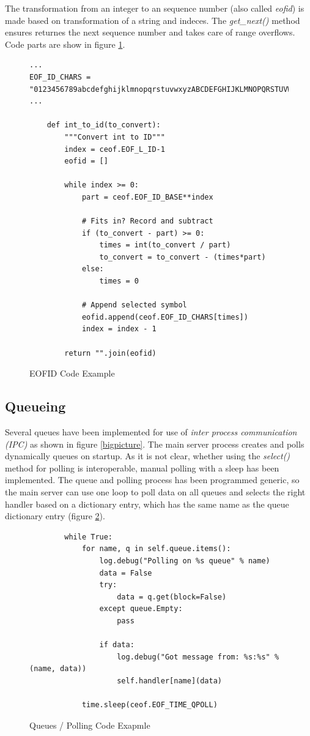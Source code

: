 The transformation from an integer to an sequence 
number (also called \textit{eofid}) is made based on transformation
of a string and indeces. The \textit{get\_next()} method ensures returnes
the next sequence number and takes care of range overflows.
Code parts are show in figure \ref{eofid}.
\begin{figure}[htbp][htb]
\caption{EOFID Code Example}
\label{eofid}
\begin{verbatim}
...
EOF_ID_CHARS = "0123456789abcdefghijklmnopqrstuvwxyzABCDEFGHIJKLMNOPQRSTUVWXYZ-!"
...

    def int_to_id(to_convert):
        """Convert int to ID"""
        index = ceof.EOF_L_ID-1
        eofid = []

        while index >= 0:
            part = ceof.EOF_ID_BASE**index

            # Fits in? Record and subtract
            if (to_convert - part) >= 0:
                times = int(to_convert / part)
                to_convert = to_convert - (times*part)
            else:
                times = 0 

            # Append selected symbol
            eofid.append(ceof.EOF_ID_CHARS[times])
            index = index - 1 

        return "".join(eofid)
\end{verbatim}
\end{figure}
\subsection{Queueing}
Several queues have been implemented for use of 
\textit{inter process communication (IPC)} as shown in figure \ref{bigpicture}.
The main server process creates and polls dynamically queues on startup.
As it is not clear, whether using the \textit{select()} method
for polling is interoperable, manual polling with a sleep has been 
implemented. The queue and polling process
has been programmed generic, so the main server can use one loop
to poll data on all queues and selects the right handler based on
a dictionary entry, which has the same name as the queue dictionary
entry (figure \ref{queuepoll}).
\begin{figure}[htbp][htb]
\caption{Queues / Polling Code Exapmle}
\label{queuepoll}
\begin{verbatim}
        while True:
            for name, q in self.queue.items():
                log.debug("Polling on %s queue" % name)
                data = False
                try:
                    data = q.get(block=False)
                except queue.Empty:
                    pass

                if data:
                    log.debug("Got message from: %s:%s" % (name, data))
                    self.handler[name](data)

            time.sleep(ceof.EOF_TIME_QPOLL)
\end{verbatim}
\end{figure}
